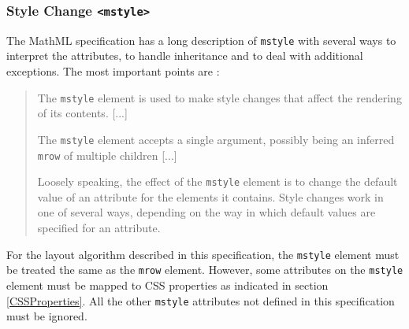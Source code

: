 \begin{figure}
\centering
{}
\label{RootBoxModel}
\end{figure}

\subsubsection{Style Change {\tt <mstyle>}}

The MathML specification has a long description of {\tt mstyle} with several
ways to interpret the attributes, to handle inheritance and to deal with
additional exceptions. The most important points are \cite{MathML3}:
%
\begin{quote}
The {\tt mstyle} element is used to make style changes that affect the
rendering of its contents. [...]

The {\tt mstyle} element accepts a single argument, possibly being an inferred
{\tt mrow} of multiple children [...]

Loosely speaking, the effect of the {\tt mstyle} element is to change the
default value of an attribute for the elements it contains. Style changes work
in one of several ways, depending on the way in which default values are
specified for an attribute.
\end{quote}

For the layout algorithm described in this specification, the
{\tt mstyle} element must be treated the same as the {\tt mrow} element.
However, some attributes on the {\tt mstyle} element must be mapped to CSS
properties as indicated in section \ref{CSSProperties}.
All the other {\tt mstyle}
attributes not defined in this specification must be ignored.

